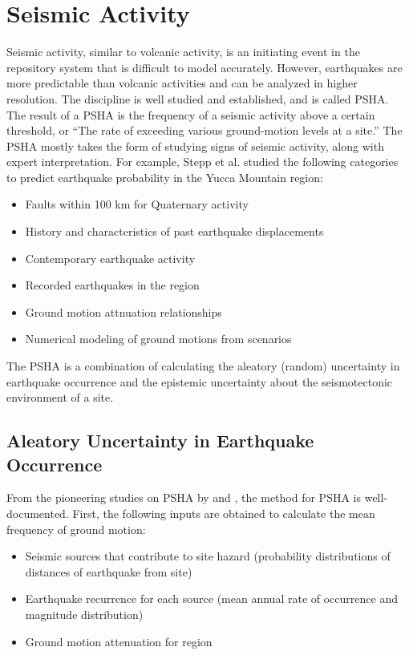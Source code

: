\documentclass[12pt]{article}
\begin{document}
\FloatBarrier


\section{Seismic Activity}

Seismic activity, similar to volcanic activity, is an initiating event
in the repository system that is difficult to model accurately. However,
earthquakes are more predictable than volcanic activities and can be 
analyzed in higher resolution. The discipline is well studied and 
established, and is called \gls{PSHA}.
The result of a \gls{PSHA} is the frequency of a seismic activity above
a certain threshold, or ``The rate of exceeding various ground-motion
levels at a site.'' \cite{thenhaus_seismic_2003}
 The \gls{PSHA} mostly takes the form of studying signs of seismic activity,
along with expert interpretation.
For example, Stepp et al. \cite{stepp_probabilistic_2001} studied the following categories
to predict earthquake probability in the Yucca Mountain region:
\begin{itemize}
    \item Faults within 100 km for Quaternary activity
    \item History and characteristics of past earthquake displacements  
    \item Contemporary earthquake activity
    \item Recorded earthquakes in the region
    \item Ground motion attnuation relationships
    \item Numerical modeling of ground motions from scenarios
\end{itemize}

The \gls{PSHA} is a combination of 
calculating the aleatory (random) uncertainty in
earthquake occurrence and the epistemic uncertainty
about the seismotectonic environment of a site.

\subsection{Aleatory Uncertainty in Earthquake Occurrence}

From the pioneering studies on \gls{PSHA} by \cite{mcguire_fortran_1976}
and \cite{cornell_engineering_1968}, the method for \gls{PSHA} 
is well-documented. First, the following inputs are obtained to calculate
the mean frequency of ground motion:

\begin{itemize}
    \item Seismic sources that contribute to site hazard 
    (probability distributions of distances of earthquake from site)
    \item Earthquake recurrence for each source 
    (mean annual rate of occurrence and magnitude distribution)
    \item Ground motion attenuation for region
\end{itemize}
\end{document}

